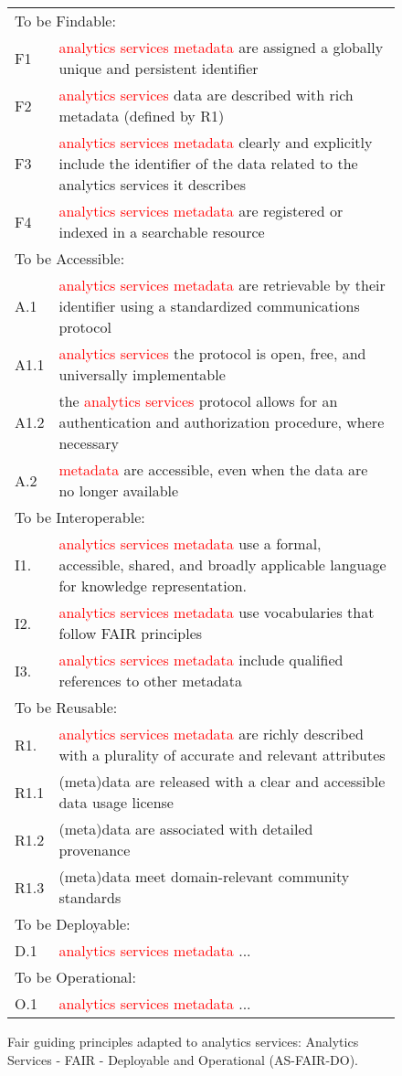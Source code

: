 \begin{figure}[htb]
{{\begin{tabular}{p{1cm}p{15cm}}
\multicolumn{2}{l}{To be Findable:} \\
F1 & \textcolor{red}{analytics services metadata} are assigned a globally unique and persistent identifier \\ 
F2 & \textcolor{red}{analytics services} data are described with rich metadata (defined by R1) \\
F3 &  \textcolor{red}{analytics services metadata} clearly and explicitly include the identifier of the data related to the analytics services it describes \\ 
F4 & \textcolor{red}{analytics services metadata} are registered or indexed in a searchable resource \\
\multicolumn{2}{l}{To be Accessible:} \\
A.1 &  \textcolor{red}{analytics services metadata} are retrievable by their identifier using a standardized communications protocol \\
    A1.1 & \textcolor{red}{analytics services} the protocol is open, free, and universally implementable \\
    A1.2 & the \textcolor{red}{analytics services} protocol allows for an authentication and authorization procedure, where necessary \\ 
A.2 & \textcolor{red}{metadata} are accessible, even when the data are no longer available \\
\multicolumn{2}{l}{To be Interoperable:}\\
I1. & \textcolor{red}{analytics services metadata} use a formal, accessible, shared, and broadly applicable language for knowledge representation. \\
I2. &  \textcolor{red}{analytics services metadata} use vocabularies that follow FAIR principles \\
I3. &  \textcolor{red}{analytics services metadata} include qualified references to other metadata \\
\multicolumn{2}{l}{To be Reusable:} \\
R1. & \textcolor{red}{analytics services metadata} are richly described with a plurality of accurate and relevant attributes \\
R1.1 & (meta)data are released with a clear and accessible data usage license \\
R1.2 & (meta)data are associated with detailed provenance \\
R1.3 & (meta)data meet domain-relevant community standards \\
\multicolumn{2}{l}{To be Deployable:}\\
D.1 & \textcolor{red}{analytics services metadata} ... \\
\multicolumn{2}{l}{To be Operational:} \\ 
O.1 & \textcolor{red}{analytics services metadata} ... \\ 
\end{tabular}
}
}
\caption{Fair guiding principles adapted to analytics services:
  Analytics Services - FAIR - Deployable and Operational
  (AS-FAIR-DO).}\label{fig:as-fair-do}
\end{figure}

